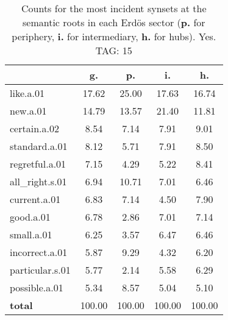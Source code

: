 \begin{table}[h!]
\begin{center}
\begin{tabular}{| l || c | c | c | c |}\hline
 & {\bf g.} & {\bf p.} & {\bf i.} & {\bf h.} \\\hline\hline
like.a.01 & 17.62  & 25.00  & 17.63  & 16.74 \\\hline
new.a.01 & 14.79  & 13.57  & 21.40  & 11.81 \\\hline
certain.a.02 & 8.54  & 7.14  & 7.91  & 9.01 \\\hline
standard.a.01 & 8.12  & 5.71  & 7.91  & 8.50 \\\hline
regretful.a.01 & 7.15  & 4.29  & 5.22  & 8.41 \\\hline
all\_right.s.01 & 6.94  & 10.71  & 7.01  & 6.46 \\\hline
current.a.01 & 6.83  & 7.14  & 4.50  & 7.90 \\\hline
good.a.01 & 6.78  & 2.86  & 7.01  & 7.14 \\\hline
small.a.01 & 6.25  & 3.57  & 6.47  & 6.46 \\\hline
incorrect.a.01 & 5.87  & 9.29  & 4.32  & 6.20 \\\hline
particular.s.01 & 5.77  & 2.14  & 5.58  & 6.29 \\\hline
possible.a.01 & 5.34  & 8.57  & 5.04  & 5.10 \\\hline\hline
{{\bf total}} & 100.00  & 100.00  & 100.00  & 100.00 \\\hline
\end{tabular}
\caption{Counts for the most incident synsets at the semantic roots in each Erd\"os sector ({\bf p.} for periphery, {\bf i.} for intermediary, {\bf h.} for hubs). Yes. TAG: 15}
\end{center}
\end{table}